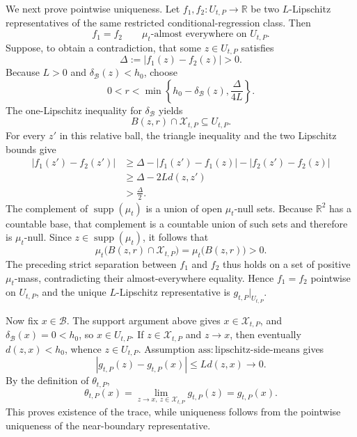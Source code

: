 We next prove pointwise uniqueness.  Let \(f_1,f_2:U_{t,P}\to\mathbb R\) be two \(L\)-Lipschitz representatives of the same restricted conditional-regression class.  Then
\[
f_1=f_2\qquad\mu_t\text{-almost everywhere on }U_{t,P}.
\]
Suppose, to obtain a contradiction, that some \(z\in U_{t,P}\) satisfies
\[
\Delta:=|f_1(z)-f_2(z)|>0.
\]
Because \(L>0\) and \(\delta_{\mathcal B}(z)<h_0\), choose
\[
0<r<\min\left\{h_0-\delta_{\mathcal B}(z),\frac{\Delta}{4L}\right\}.
\]
The one-Lipschitz inequality for \(\delta_{\mathcal B}\) yields
\[
B(z,r)\cap\mathcal X_{t,P}\subseteq U_{t,P}.
\]
For every \(z'\) in this relative ball, the triangle inequality and the two Lipschitz bounds give
\[
\begin{aligned}
|f_1(z')-f_2(z')|
&\ge \Delta-|f_1(z')-f_1(z)|-|f_2(z')-f_2(z)|\\
&\ge \Delta-2Ld(z,z')\\
&>\frac{\Delta}{2}.
\end{aligned}
\]
The complement of \(\operatorname{supp}(\mu_t)\) is a union of open \(\mu_t\)-null sets.  Because \(\mathbb R^2\) has a countable base, that complement is a countable union of such sets and therefore is \(\mu_t\)-null.  Since \(z\in\operatorname{supp}(\mu_t)\), it follows that
\[
\mu_t\bigl(B(z,r)\cap\mathcal X_{t,P}\bigr)
=\mu_t\bigl(B(z,r)\bigr)>0.
\]
The preceding strict separation between \(f_1\) and \(f_2\) thus holds on a set of positive \(\mu_t\)-mass, contradicting their almost-everywhere equality.  Hence \(f_1=f_2\) pointwise on \(U_{t,P}\), and the unique \(L\)-Lipschitz representative is \(g_{t,P}|_{U_{t,P}}\).

Now fix \(x\in\mathcal B\).  The support argument above gives \(x\in\mathcal X_{t,P}\), and \(\delta_{\mathcal B}(x)=0<h_0\), so \(x\in U_{t,P}\).  If \(z\in\mathcal X_{t,P}\) and \(z\to x\), then eventually \(d(z,x)<h_0\), whence \(z\in U_{t,P}\).  Assumption \(\mathrm{ass:lipschitz\text{-}side\text{-}means}\) gives
\[
|g_{t,P}(z)-g_{t,P}(x)|\le Ld(z,x)\longrightarrow0.
\]
By the definition of \(\theta_{t,P}\),
\[
\theta_{t,P}(x)
=\lim_{z\to x,\ z\in\mathcal X_{t,P}}g_{t,P}(z)
=g_{t,P}(x).
\]
This proves existence of the trace, while uniqueness follows from the pointwise uniqueness of the near-boundary representative.


